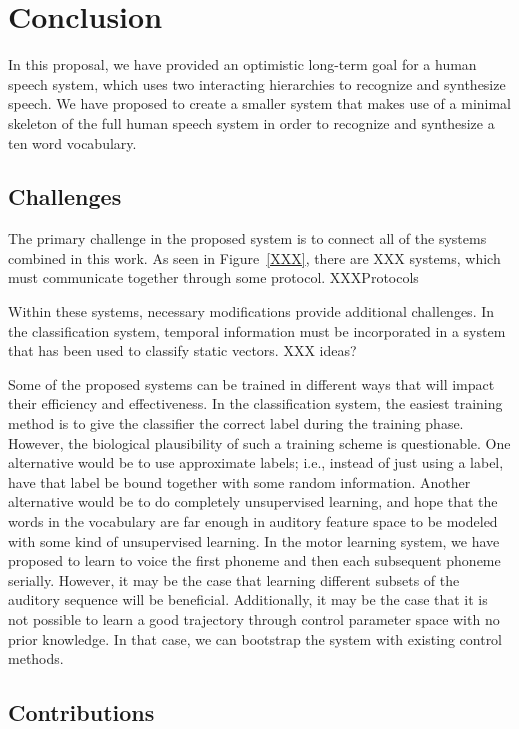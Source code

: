 \documentclass{article}
\begin{document}
\section{Conclusion} \label{sec:conclusion}

In this proposal,
we have provided an optimistic long-term goal
for a human speech system,
which uses two interacting hierarchies
to recognize and synthesize speech.
We have proposed to create a smaller system
that makes use of a minimal skeleton
of the full human speech system
in order to recognize and synthesize
a ten word vocabulary.

\subsection{Challenges} \label{subsec:challenges}

The primary challenge in the proposed system
is to connect all of the
systems combined in this work.
As seen in Figure~\ref{XXX},
there are XXX systems,
which must communicate together
through some protocol.
XXXProtocols

Within these systems,
necessary modifications provide
additional challenges.
In the classification system,
temporal information
must be incorporated in
a system that has been used
to classify static vectors.
XXX ideas?

Some of the proposed systems
can be trained in different ways
that will impact their efficiency and effectiveness.
In the classification system,
the easiest training method
is to give the classifier
the correct label during the training phase.
However, the biological plausibility
of such a training scheme is questionable.
One alternative would be to
use approximate labels;
i.e., instead of just using a label,
have that label be bound together
with some random information.
Another alternative would be
to do completely unsupervised learning,
and hope that the words in the vocabulary
are far enough in auditory feature space
to be modeled with some kind of
unsupervised learning.
In the motor learning system,
we have proposed to learn to voice
the first phoneme and then each
subsequent phoneme serially.
However, it may be the case that
learning different subsets
of the auditory sequence
will be beneficial.
Additionally, it may be the case
that it is not possible
to learn a good trajectory
through control parameter space
with no prior knowledge.
In that case, we can bootstrap the system
with existing control methods.

\subsection{Contributions}
\label{subsec:contributions}
\end{document}
